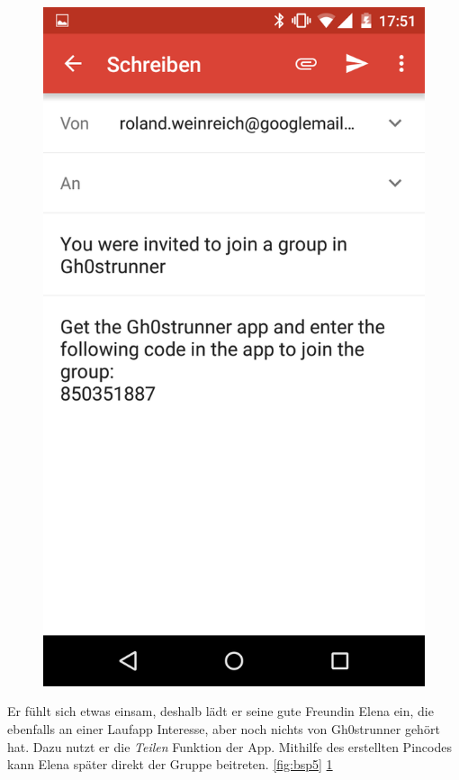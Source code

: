 \begin{figure}
\begin{minipage}{.4\textwidth}
  \includegraphics[width=.8\linewidth]{abb/bsp/bsp6}
  \label{fig:bsp6}
\end{minipage}
\end{figure}

Er fühlt sich etwas einsam, deshalb lädt er seine gute Freundin Elena ein, die ebenfalls an einer Laufapp Interesse, aber noch nichts von Gh0strunner gehört hat. Dazu nutzt er die \textit{Teilen} Funktion der App. Mithilfe des erstellten Pincodes kann Elena später direkt der Gruppe beitreten. \ref{fig:bsp5} \ref{fig:bsp6}


